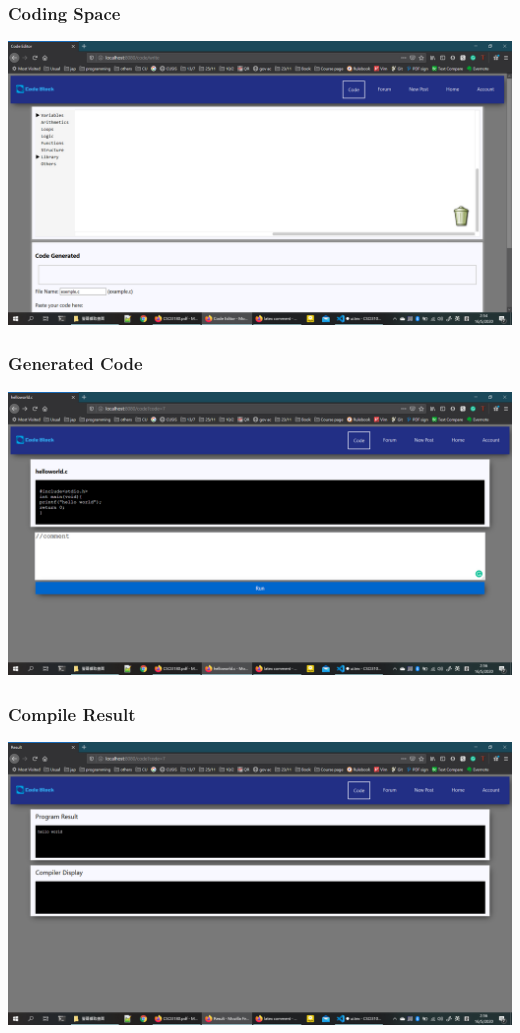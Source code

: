 \subsubsection{Coding Space}
\includegraphics[scale=0.4]{Doc/Pics/code.png}

\subsubsection{Generated Code}
\includegraphics[scale=0.4]{Doc/Pics/generated_code.png}

\subsubsection{Compile Result}
\includegraphics[scale=0.4]{Doc/Pics/compile_result.png}

